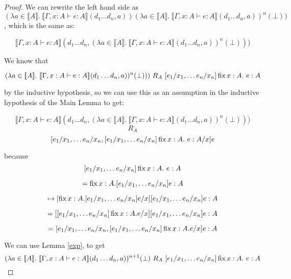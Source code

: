 \begin{proof}
We can rewrite the left hand side as $(\lambda a \in \llbracket A \rrbracket. \ \llbracket \Gamma, x : A \vdash e : A \rrbracket(d_1 \dots d_n,a))(\lambda a \in \llbracket A \rrbracket. \ \llbracket \Gamma, x : A \vdash e : A \rrbracket(d_1 \dots d_n,a))^n(\bot)) $, which is the same as:

\[ \llbracket \Gamma, x : A \vdash e : A \rrbracket(d_1 \dots d_n,(\lambda a \in \llbracket A \rrbracket. \ \llbracket \Gamma, x : A \vdash e : A \rrbracket(d_1 \dots d_n,a))^n(\bot)))\]

We know that 

\[(\lambda a \in \llbracket A \rrbracket. \ \llbracket \Gamma, x : A \vdash e : A \rrbracket(d_1 \dots d_n,a))^n(\bot))) \ R_A \ [e_1/x_1, \dots e_n/x_n]\operatorname{fix} x : A. \ e : A\]

by the inductive hypothesis, so we can use this as an assumption in the inductive hypothesis of the Main Lemma to get:

\[ \llbracket \Gamma, x : A \vdash e : A \rrbracket(d_1 \dots d_n,(\lambda a \in \llbracket A \rrbracket. \ \llbracket \Gamma, x : A \vdash e : A \rrbracket(d_1 \dots d_n,a))^n(\bot)))\]
\[ R_A \]
\[ [e_1/x_1, \dots e_n/x_n, [e_1/x_1, \dots e_n/x_n]\operatorname{fix} x : A. \ e : A/x]e \]

because 
\[[e_1/x_1, \dots e_n/x_n]\operatorname{fix} x : A. \ e : A \]

\[ = \operatorname{fix}  x : A. [e_1/x_1, \dots e_n/x_n]e : A \]

\[\mapsto [\operatorname{fix} x:A. [e_1/x_1, \dots e_n/x_n]e/x][e_1/x_1, \dots e_n/x_n] e : A\]

\[ = [[e_1/x_1, \dots e_n/x_n] \operatorname{fix} x:A. e/x] [e_1/x_1, \dots e_n/x_n] e : A\]

\[ = [e_1/x_1, \dots e_n/x_n, [e_1/x_1, \dots e_n/x_n] \operatorname{fix} x:A. e/x] e : A \]

We can use Lemma \ref{exp}, to get 
\[(\lambda a \in \llbracket A \rrbracket. \ \llbracket \Gamma, x : A \vdash e : A \rrbracket(d_1 \dots d_n,a))^{n+1}(\bot) \ R_A \ [e_1/x_1, \dots e_n/x_n]\fix x : A. \ e : A\]





 



\end{proof}

